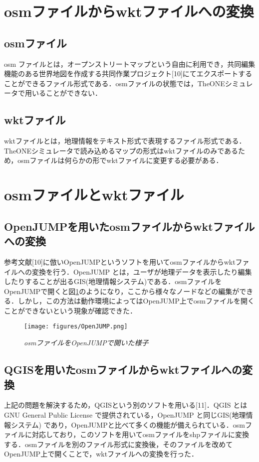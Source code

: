 \documentclass[11pt]{icsthesis}
\begin{document}
\section{osmファイルからwktファイルへの変換}



\subsection{osmファイル}
osm ファイルとは，オープンストリートマップという自由に利用でき，共同編集機能のある世界地図を作成する共同作業プロジェクト[10]にてエクスポートすることができるファイル形式である．osmファイルの状態では，TheONEシミュレータで用いることができない．
\subsection{wktファイル}
wktファイルとは，地理情報をテキスト形式で表現するファイル形式である．TheONEシミュレータで読み込めるマップの形式はwktファイルのみであるため，osmファイルは何らかの形でwktファイルに変更する必要がある．
\section{osmファイルとwktファイル}

\subsection{OpenJUMPを用いたosmファイルからwktファイルへの変換}
参考文献[10]に倣いOpenJUMPというソフトを用いてosmファイルからwktファイルへの変換を行う．OpenJUMP とは，ユーザが地理データを表示したり編集したりすることが出るGIS(地理情報システム)である．osmファイルをOpenJUMPで開くと図\ref{OpenJUMP}のようになり，ここから様々なノードなどの編集ができる．しかし，この方法は動作環境によってはOpenJUMP上でosmファイルを開くことができないという現象が確認できた．
\begin{figure}[H]
	\centering
	\texttt{[image: figures/OpenJUMP.png]}
\caption[]{\it{osmファイルをOpenJUMPで開いた様子}}
\label{OpenJUMP}
\end{figure}
\subsection{QGISを用いたosmファイルからwktファイルへの変換}
上記の問題を解決するため，QGISという別のソフトを用いる[11]．QGIS とはGNU General Public License で提供されている，OpenJUMP と同じGIS(地理情報システム) であり，OpenJUMPと比べて多くの機能が備えられている．osmファイルに対応しており，このソフトを用いてosmファイルをshpファイルに変換する．osmファイルを別のファイル形式に変換後，そのファイルを改めてOpenJUMP上で開くことで，wktファイルへの変換を行った．
\end{document}
